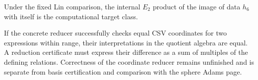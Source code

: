 \begin{lemma}
  \label{lem:lin-h6-square-product}
  \notready
  Under the fixed Lin comparison, the internal $E_2$ product of the image of
  data $h_6$ with itself is the computational target class.
\end{lemma}

\begin{theorem}
  \label{thm:lin-e2-coordinate-check}
  \notready
  If the concrete reducer successfully checks equal CSV coordinates for two
  expressions within range, their interpretations in the quotient algebra
  are equal. A reduction certificate must express their difference as a
  sum of multiples of the defining relations. Correctness of the coordinate
  reducer remains unfinished and is separate from basis certification and
  comparison with the sphere Adams page.
\end{theorem}

